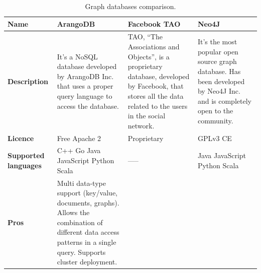 \begin{table}[!b]
    \caption{Graph databases comparison.}
    \label{table:graph_databases_comparison}
    \centering
    \large
    \begin{tabularx}{\linewidth} {
        |>{\hsize=0.7\hsize}X|
        >{\hsize=1.1\hsize}X|
        >{\hsize=1.1\hsize}X|
        >{\hsize=1.1\hsize}X| }
        \hline
        \textbf{Name}
         & ArangoDB \cite{arangodb_documentation}
         & Facebook TAO \cite{facebook_tao_article}
         & Neo4J \cite{neo4j_documentation}                                                                                                                                                                                 \\ \hline
        \textbf{Description}
         & It's a NoSQL database developed by ArangoDB Inc. that uses a proper query language to access the database.
         & TAO, “The Associations and Objects”, is a proprietary database, developed by Facebook, that stores all the data related to the users in the social network.
         & It's the most popular open source graph database. Has been developed by Neo4J Inc. and is completely open to the community.                                                                                      \\ \hline
        \textbf{Licence}
         & Free Apache 2
         & Proprietary
         & GPLv3 CE                                                                                                                                                                                                         \\ \hline
        \textbf{Supported languages}
         & C++ \newline
        Go \newline
        Java \newline
        JavaScript \newline
        Python \newline
        Scala
         & \centering -----
         & Java \newline
        JavaScript \newline
        Python \newline
        Scala                                                                                                                                                                                                               \\ \hline
        \textbf{Pros}
         & Multi data-type support (key/value, documents, graphs). Allows the combination of different data access patterns in a single query. Supports cluster deployment.

\end{tabularx}
\end{table}
